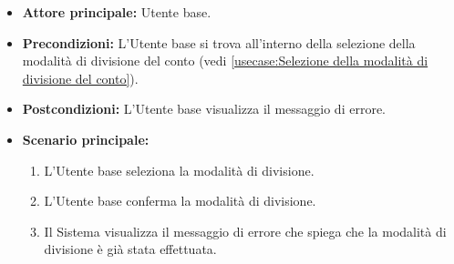 \label{usecase:Modalità di divisione del conto già effettuata}
\begin{itemize}
	\item \textbf{Attore principale:} Utente base.

	\item \textbf{Precondizioni:}
	      L'Utente base si trova all'interno della selezione della modalità di divisione del conto (vedi \autoref{usecase:Selezione della modalità di divisione del conto}).

	\item \textbf{Postcondizioni:}
	      L'Utente base visualizza il messaggio di errore.

	\item \textbf{Scenario principale:}
	      \begin{enumerate}
		      \item L'Utente base seleziona la modalità di divisione.

		      \item L'Utente base conferma la modalità di divisione.

		      \item Il Sistema visualizza il messaggio di errore che spiega che
		            la modalità di divisione è già stata effettuata.
	      \end{enumerate}
\end{itemize}
